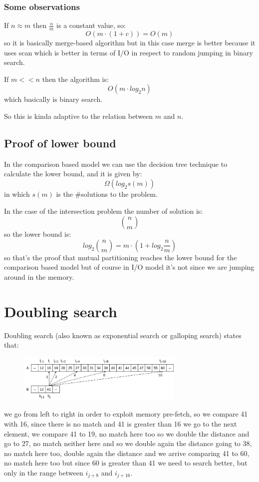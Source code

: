 \subsubsection{Some observations}
If $n \approx m$ then $\frac{n}{m}$ is a constant value, so:
$$
    O(m \cdot (1+c)) = O(m)
$$
so it is basically merge-based algorithm but in this case merge is better because it uses scan which is better in terms of I/O in respect to random jumping in binary search.

If $m << n$ then the algorithm is:
$$
    O(m \cdot log_2 n)
$$
which basically is binary search.

So this is kinda adaptive to the relation between $m$ and $n$.

\subsection{Proof of lower bound}
In the comparison based model we can use the decision tree technique to calculate the lower bound, and it is given by:
$$
    \Omega(log_2 s(m))
$$
in which $s(m)$ is the $\#$solutions to the problem.

In the case of the intersection problem the number of solution is:
$$
    \binom{n}{m}
$$
so the lower bound is:
$$
    log_2 \binom{n}{m} = m \cdot \left( 1 + log_2 \frac{n}{m} \right)
$$
so that's the proof that mutual partitioning reaches the lower bound for the comparison based model but of course in I/O model it's not since we are jumping around in the memory.

\section{Doubling search}
Doubling search (also known as exponential search or galloping search) states that:
\begin{figure}[H]
    \centering
    \includegraphics[width=300px]{images/6_Set_intersection/doubling_search.png}
\end{figure}
we go from left to right in order to exploit memory pre-fetch, so we compare 41 with 16, since there is no match and 41 is greater than 16 we go to the next element, we compare 41 to 19, no match here too so we double the distance and go to 27, no match neither here and so we double again the distance going to 38, no match here too, double again the distance and we arrive comparing 41 to 60, no match here too but since 60 is greater than 41 we need to search better, but only in the range between $i_{j+8}$ and $i_{j+16}$.

